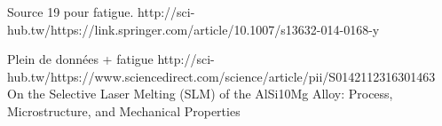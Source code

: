  \begin{center}
\begin{table}[ht]
\noindent{}
\caption[Mechanical properties for different plate pre heating temperatures (from Wang et al., 2018) \parencite{Wang2018}.]{Mechanical properties for different plate pre heating temperatures (from Wang et al., 2018) \parencite{Wang2018}.}
\label{tab:Wang}
\end{table}
 \end{center}

Source 19 pour fatigue.
http://sci-hub.tw/https://link.springer.com/article/10.1007/s13632-014-0168-y

Plein de données + fatigue
http://sci-hub.tw/https://www.sciencedirect.com/science/article/pii/S0142112316301463
 On the Selective Laser Melting (SLM) of the AlSi10Mg Alloy: Process, Microstructure, and Mechanical Properties\\
 
 
%

